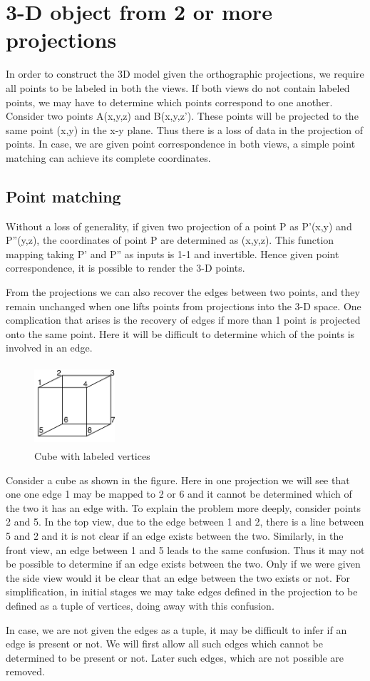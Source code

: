 \documentclass{article}
\begin{document}
\section{3-D object from 2 or more projections}
In order to construct the 3D model given the orthographic projections, we require all points to be labeled in both the views. If both views do not contain labeled points, we may have to determine which points correspond to one another. Consider two points A(x,y,z) and B(x,y,z'). These points will be projected to the same point (x,y) in the x-y plane. Thus there is a loss of data in the projection of points. In case, we are given point correspondence in both views, a simple point matching can achieve its complete coordinates.
\subsection{Point matching}
Without a loss of generality, if given two projection of a point P as P'(x,y) and P''(y,z), the coordinates of point P are determined as (x,y,z). This function mapping taking P' and P'' as inputs is 1-1 and invertible. Hence given point correspondence, it is possible to render the 3-D points.
\par From the projections we can also recover the edges between two points, and they remain unchanged when one lifts points from projections into the 3-D space. One complication that arises is the recovery of edges if more than 1 point is projected onto the same point. Here it will be difficult to determine which of the points is involved in an edge.
\begin{figure}
\includegraphics[width=3cm,height=3cm]{cube.png}
\centering
\caption{Cube with labeled vertices}
\end{figure}
\par
Consider a cube as shown in the figure. Here in one projection we will see that one one edge 1 may be mapped to 2 or 6 and it cannot be determined which of the two it has an edge with. To explain the problem more deeply, consider points 2 and 5. In the top view, due to the edge between 1 and 2, there is a line between 5 and 2 and it is not clear if an edge exists between the two. Similarly, in the front view, an edge between 1 and 5 leads to the same confusion. Thus it may not be possible to determine if an edge exists between the two. Only if we were given the side view would it be clear that an edge between the two exists or not. For simplification, in initial stages we may take edges defined in the projection to be defined as a tuple of vertices, doing away with this confusion.
\par In case, we are not given the edges as a tuple, it may be difficult to infer if an edge is present or not. We will first allow all such edges which cannot be determined to be present or not. Later such edges, which are not possible are removed. 
\end{document}
